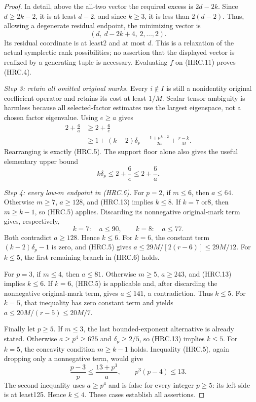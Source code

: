 \begin{proof}
In detail, above the all-two vector the required excess is
\(2d-2k\).  Since \(d\ge2k-2\), it is at least \(d-2\),
and since \(k\ge3\), it is less than \(2(d-2)\).
Thus, allowing a degenerate residual endpoint, the minimizing vector is
\[
                 (d,\ d-2k+4,\ 2,\ldots,2).
 \tag{HRC.11}
\]
Its residual coordinate is at least2 and at most \(d\).
This is a relaxation of the actual symplectic rank possibilities;
no assertion that the displayed vector is realized by a generating
tuple is necessary.  Evaluating \(f\) on (HRC.11) proves (HRC.4).

\emph{Step 3: retain all omitted original marks.}
Every \(i\notin I\) is still a nonidentity original coefficient
operator and retains its cost at least \(1/M\).  Scalar tensor
ambiguity is harmless because all selected-factor estimates use
the largest eigenspace, not a chosen factor eigenvalue.
Using \(e\ge a\) gives
\[
 \begin{split}
 2+\frac6a
 &\ge2+\frac6e\\
 &\ge1+(k-2)\delta_p-\frac{1+p^{\,k-2}}{2a}
                     +\frac{r-k}{M}.
 \end{split}
 \tag{HRC.12}
\]
Rearranging is exactly (HRC.5).  The support floor alone also gives
the useful elementary upper bound
\[
                      k\delta_p\le2+\frac6e\le2+\frac6a.
 \tag{HRC.13}
\]

\emph{Step 4: every low-\(m\) endpoint in (HRC.6).}
For \(p=2\), if \(m\le6\), then \(a\le64\).
Otherwise \(m\ge7\), \(a\ge128\), and (HRC.13) implies \(k\le8\).
If \(k=7\) or8, then \(m\ge k-1\), so (HRC.5) applies.
Discarding its nonnegative original-mark term gives, respectively,
\[
        k=7:\quad a\le90,\qquad
        k=8:\quad a\le77.
 \tag{HRC.14}
\]
Both contradict \(a\ge128\).  Hence \(k\le6\).
For \(k=6\), the constant term \((k-2)\delta_p-1\) is zero,
and (HRC.5) gives
\(a\le29M/[2(r-6)]\le29M/12\).
For \(k\le5\), the first remaining branch in (HRC.6) holds.

For \(p=3\), if \(m\le4\), then \(a\le81\).
Otherwise \(m\ge5\), \(a\ge243\), and (HRC.13) implies \(k\le6\).
If \(k=6\), (HRC.5) is applicable and, after discarding the
nonnegative original-mark term, gives \(a\le141\), a contradiction.
Thus \(k\le5\).  For \(k=5\), that inequality has zero constant
term and yields \(a\le20M/(r-5)\le20M/7\).

Finally let \(p\ge5\).  If \(m\le3\), the last bounded-exponent
alternative is already stated.  Otherwise \(a\ge p^4\ge625\)
and \(\delta_p\ge2/5\), so (HRC.13) implies \(k\le5\).
For \(k=5\), the concavity condition \(m\ge k-1\) holds.
Inequality (HRC.5), again dropping only a nonnegative term, would give
\[
 \frac{p-3}{p}\le\frac{13+p^3}{a},
 \qquad
                   p^3(p-4)\le13.
 \tag{HRC.15}
\]
The second inequality uses \(a\ge p^4\) and is false for every
integer \(p\ge5\): its left side is at least125.
Hence \(k\le4\).  These cases establish all assertions.
\end{proof}

